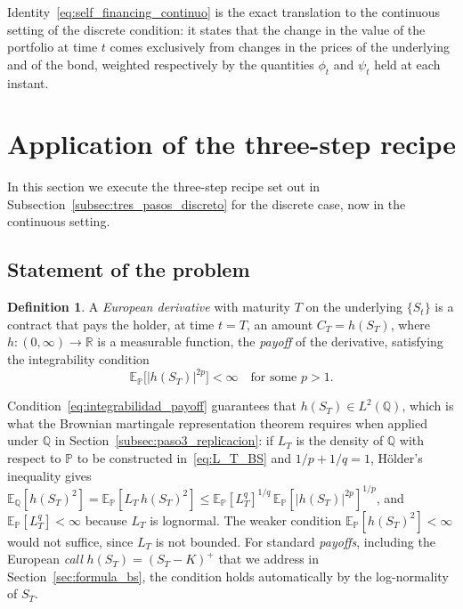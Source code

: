 \documentclass[11pt,a4paper,oneside]{report}
\theoremstyle{plain}
\theoremstyle{definition}
\newtheorem{definicion}[teorema]{Definition}
\theoremstyle{remark}
\newcommand{\R}{\mathbb{R}}
\newcommand{\E}{\mathbb{E}}
\newcommand{\PP}{\mathbb{P}}
\newcommand{\Q}{\mathbb{Q}}
\newcommand{\1}{\mathbf{1}}
\begin{document}
Identity~\eqref{eq:self_financing_continuo} is the exact translation
to the continuous setting of the discrete condition: it states that
the change in the value of the portfolio at time $t$ comes
exclusively from changes in the prices of the underlying and of the
bond, weighted respectively by the quantities $\phi_t$ and $\psi_t$
held at each instant.

\section{Application of the three-step recipe}
\label{sec:tres_pasos_continuo}

In this section we execute the three-step recipe set out in
Subsection~\ref{subsec:tres_pasos_discreto} for the discrete case,
now in the continuous setting.

\subsection{Statement of the problem}
\label{subsec:planteamiento_continuo}

\begin{definicion}
\label{def:derivado_europeo}
A \emph{European derivative} with maturity $T$ on the underlying
$\{S_t\}$ is a contract that pays the holder, at time $t = T$, an
amount $C_T = h(S_T)$, where $h : (0, \infty) \to \R$ is a measurable
function, the \emph{payoff} of the derivative, satisfying the
integrability condition
\begin{equation}\label{eq:integrabilidad_payoff}
  \E_\PP\bigl[|h(S_T)|^{2p}\bigr] < \infty \quad \text{for some } p > 1.
\end{equation}
\end{definicion}

Condition~\eqref{eq:integrabilidad_payoff} guarantees that $h(S_T) \in L^2(\Q)$, which is what the Brownian martingale representation theorem requires when applied under $\Q$ in Section~\ref{subsec:paso3_replicacion}: if $L_T$ is the density of $\Q$ with respect to $\PP$ to be constructed in~\eqref{eq:L_T_BS} and $1/p + 1/q = 1$, Hölder's inequality gives $\E_\Q[h(S_T)^2] = \E_\PP[L_T\, h(S_T)^2] \le \E_\PP[L_T^q]^{1/q}\, \E_\PP[|h(S_T)|^{2p}]^{1/p}$, and $\E_\PP[L_T^q] < \infty$ because $L_T$ is lognormal. The weaker condition $\E_\PP[h(S_T)^2] < \infty$ would not suffice, since $L_T$ is not bounded. For standard \emph{payoffs}, including the European \emph{call} $h(S_T) = (S_T - K)^+$ that we address in Section~\ref{sec:formula_bs}, the condition holds automatically by the log-normality of $S_T$.
\end{document}
